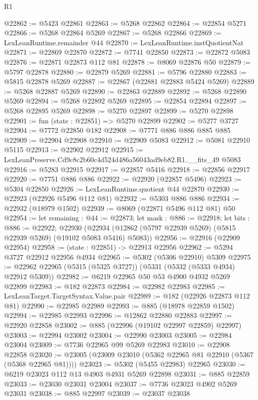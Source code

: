 \begin{lexlean}{R1}
\begin{coremodule}
@22862 := @5423 @22861
@22863 := @5268 @22862
@22864 := @22854 @5271
@22866 := @5268 @22864 @5269
@22867 := @5268 @22866
@22869 := LexLeanRuntime.remainder @44
@22870 := LexLeanRuntime.instQuotientNat
@22871 := @22869 @22870
@22872 := @7741 @22850
@22873 := @22872 @5083
@22876 := @22871 @22873 @112 @81
@22878 := @8069 @22876 @50
@22879 := @5797 @22878
@22880 := @22879 @5269
@22881 := @5796 @22880
@22883 := @5815 @22878 @5269
@22887 := @22867 (@22881 @22883 @5424 @5269)
@22889 := @5268 @22887 @5269
@22890 := @22863 @22889
@22892 := @5268 @22890 @5269
@22894 := @5268 @22892 @5269
@22895 := @22854 @22894
@22897 := @5268 @22895 @5269
@22898 := @5270 @22897
@22899 := @5270 @22898
@22901 := fun (state : @22851) => @5270 @22899
@22902 := @5277 @3727
@22904 := @7772 @22850 @182
@22908 := @7771 @886 @886 @885 @885
@22909 := @22904 @22908
@22910 := @22909 @5083
@22912 := @5081 @22910 @5115
@22913 := @22902 @22912
@22915 := LexLeanPreserve.Cd9c8c2b60c4d524d486a56043ad9eb82.R1.__fits_49 @5083
@22916 := @5283 @22915
@22917 := @22857 @5416
@22918 := @22856 @22917
@22920 := @7751 @886 @886
@22922 := @22920 (@22857 @5496)
@22923 := @5304 @22850
@22926 := LexLeanRuntime.quotient @44 @22870
@22930 := @22923 (@22926 @5496 @112 @81)
@22932 := @5303 @886 @886
@22934 := @22932 (@18979 @1502)
@22939 := @8069 (@22871 @5496 @112 @81) @50
@22954 := let remaining : @44 := @22873;
  let mask : @886 := @22918;
  let bits : @886 := @22922;
  @22930 (@22934 (@12862 (@5797 @22939 @5269) (@5815 @22939 @5269) (@19102 @5083 @5416) @5083))
@22956 := @22916 (@22909 @22954)
@22958 := (state : @22851) -> @22913 @22956
@22962 := @5294 @3727 @22912 @22956 @4934
@22965 := @5302 (@5306 @22910) @5309
@22975 := @22962 @22965 (@5315 (@5325 @3727)) (@5331 (@5332 (@5333 @4934) @22912 @5309))
@22982 := @6219 @22965 @50 @53 @4900 @4932 @5269 @22899
@22983 := @182 @22873
@22984 := @22982 @22983
@22985 := LexLeanTarget.TargetSyntax.Value.pair
@22989 := @182 (@22926 @22873 @112 @81)
@22990 := @22985 @22989
@22993 := @885 (@18978 @22859 @1502)
@22994 := @22985 @22993
@22996 := @12862 @22880 @22883
@22997 := @22920 @22858
@23002 := @885 (@22996 (@19102 @22997 @22859) @22997)
@23003 := @22994 @23002
@23004 := @22990 @23003
@23005 := @22984 @23004
@23009 := @7736 @22965 @99 @5269 @22983
@23010 := @22908 @22858
@23020 := @23005 (@23009 @23010 (@5362 @22965 @81 @22910 (@5367 (@5368 @22965 @81))))
@23023 := @5302 (@5455 @22983) @22965
@23030 := @6219 @23023 @112 @13 @4903 @4931 @5269 @22898
@23031 := @885 @22859
@23033 := @23030 @23031 @23004
@23037 := @7736 @23023 @4902 @5269 @23031
@23038 := @885 @22997
@23039 := @23037 @23038

\end{coremodule}
\end{lexlean}
